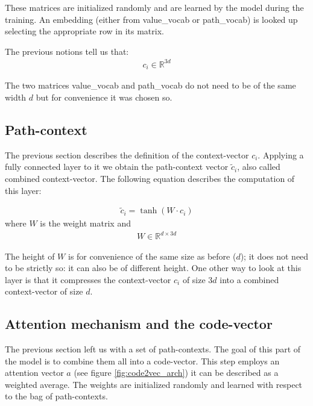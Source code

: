 These matrices are initialized randomly and are learned by the model during the training.
An embedding (either from value\_vocab or path\_vocab) is looked up selecting the appropriate row in its matrix.

The previous notions tell us that:
\begin{align*} 
c_i \in  \mathbb{R}^{3 d}
\end{align*}

The two matrices value\_vocab and path\_vocab do not need to be of the same width $d$ but for convenience it was chosen so.

\subsection{Path-context}
The previous section describes the definition of the context-vector $c_i$. Applying a fully connected layer to it we obtain the path-context vector $\widetilde{c}_i$, also called combined context-vector. The following equation describes the computation of this layer:

\begin{align*} 
\widetilde{c}_i = \tanh( W \cdot c_i )
\end{align*}
where $W$ is the weight matrix and
\begin{align*} 
W \in  \mathbb{R}^{d \times 3 d}
\end{align*}

The height of $W$ is for convenience of the same size as before ($d$); it does not need to be strictly so: it can also be of different height.
One other way to look at this layer is that it compresses the context-vector $c_i$ of size $3d$ into a combined context-vector of size $d$.

\subsection{Attention mechanism and the code-vector} \label{sec:attention_code_vector}
The previous section left us with a set of path-contexts. The goal of this part of the model is to combine them all into a code-vector.
This step employs an attention vector $a$ (see figure \ref{fig:code2vec_arch}) it can be described as a weighted average. The weights are initialized randomly and learned with respect to the bag of path-contexts. 


